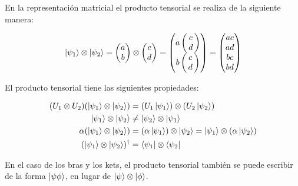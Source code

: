 En la representación matricial el producto tensorial se realiza de la siguiente manera:

\begin{equation*}
    \ket{\psi_1} \otimes \ket{\psi_2} =
    \begin{pmatrix}
        a \\
        b
    \end{pmatrix}
    \otimes
    \begin{pmatrix}
        c \\
        d
    \end{pmatrix}
    =
    \left(\!\!\!\begin{array}{c}
            a \left(\!\!\begin{array}{c}
                    c \\
                    d \\
            \end{array}\!\!\right) \\
            b \left(\!\!\begin{array}{c}
                    c \\
                    d \\
            \end{array}\!\!\right)
    \end{array}\!\!\!\right)
    =
    \begin{pmatrix}
        a c \\
        a d \\
        b c \\
        b d \\
    \end{pmatrix}
\end{equation*}

El producto tensorial tiene las siguientes propiedades:

\begin{align}
    (U_1 \otimes U_2) (\ket{\psi_1} \otimes \ket{\psi_2}) &= (U_1 \ket{\psi_1}) \otimes (U_2 \ket{\psi_2}) \\
    \ket{\psi_1} \otimes \ket{\psi_2} &\neq \ket{\psi_2} \otimes \ket{\psi_1} \\
    \alpha (\ket{\psi_1} \otimes \ket{\psi_2}) &= (\alpha \ket{\psi_1}) \otimes \ket{\psi_2} = \ket{\psi_1} \otimes (\alpha \ket{\psi_2}) \\
    (\ket{\psi_1} \otimes \ket{\psi_2})^\dagger &= \bra{\psi_1} \otimes \bra{\psi_2}
\end{align}

En el caso de los bras y los kets, el producto tensorial también se puede escribir de la forma $\ket{\psi\phi}$, en lugar de $\ket{\psi} \otimes \ket{\phi}$.

